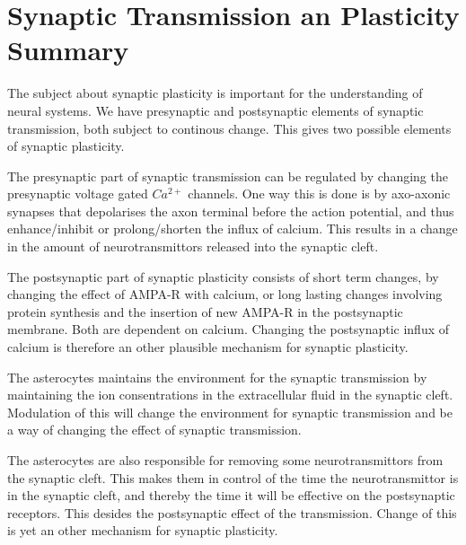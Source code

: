 \section{Synaptic Transmission an Plasticity Summary}
\label{appendixSynapticPlasticity:summary}
The subject about synaptic plasticity is important for the understanding of neural systems.
We have presynaptic and postsynaptic elements of synaptic transmission, both subject to continous change. This gives two possible elements of synaptic plasticity. 

The presynaptic part of synaptic transmission can be regulated by changing the presynaptic voltage gated $Ca^{2+}$ channels. One way this is done is by axo-axonic synapses that depolarises the axon terminal before the action potential, and thus enhance/inhibit or prolong/shorten the influx of calcium. 
This results in a change in the amount of neurotransmittors released into the synaptic cleft.

The postsynaptic part of synaptic plasticity consists of short term changes, by changing the effect of AMPA-R with calcium, or long lasting changes involving protein synthesis and the insertion of new AMPA-R in the postsynaptic membrane. Both are dependent on calcium. Changing the postsynaptic influx of calcium is therefore an other plausible mechanism for synaptic plasticity.

The asterocytes maintains the environment for the synaptic transmission by maintaining the ion consentrations in the extracellular fluid in the synaptic cleft. 
Modulation of this will change the environment for synaptic transmission and be a way of changing the effect of synaptic transmission. 

The asterocytes are also responsible for removing some neurotransmittors from the synaptic cleft. 
This makes them in control of the time the neurotransmittor is in the synaptic cleft, and thereby the time it will be effective on the postsynaptic receptors.
This desides the postsynaptic effect of the transmission. Change of this is yet an other mechanism for synaptic plasticity.



